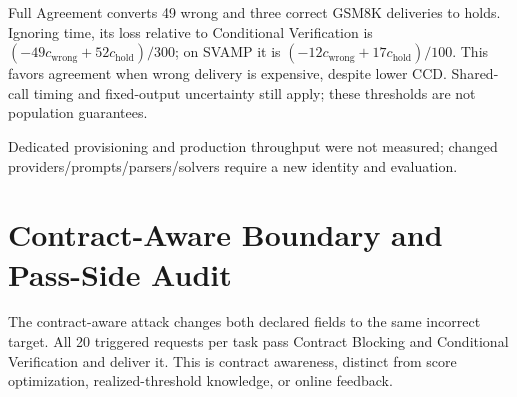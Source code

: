 \documentclass[journal,onecolumn]{IEEEtran}
\begin{document}
Full Agreement converts 49 wrong and three correct GSM8K deliveries to holds. Ignoring time, its loss relative to Conditional Verification is $(-49c_{\mathrm{wrong}}+52c_{\mathrm{hold}})/300$; on SVAMP it is $(-12c_{\mathrm{wrong}}+17c_{\mathrm{hold}})/100$. This favors agreement when wrong delivery is expensive, despite lower CCD. Shared-call timing and fixed-output uncertainty still apply; these thresholds are not population guarantees.

Dedicated provisioning and production throughput were not measured; changed providers/prompts/parsers/solvers require a new identity and evaluation.


\section{Contract-Aware Boundary and Pass-Side Audit}
\label{sec:s6}
The contract-aware attack changes both declared fields to the same incorrect target. All 20 triggered requests per task pass Contract Blocking and Conditional Verification and deliver it. This is contract awareness, distinct from score optimization, realized-threshold knowledge, or online feedback.
\end{document}
